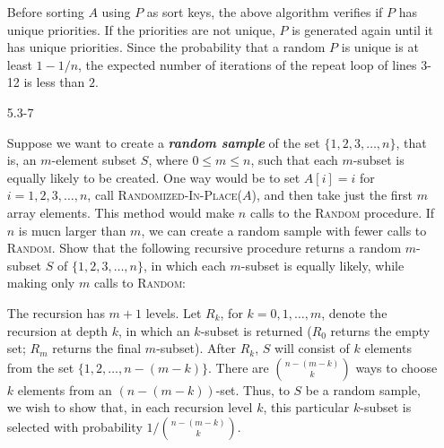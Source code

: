 \begin{enumerate}
\begin{framed}
Before sorting $A$ using $P$ as sort keys, the above algorithm verifies if $P$
has unique priorities. If the priorities are not unique, $P$ is generated again
until it has unique priorities. Since the probability that a random $P$ is
unique is at least $1 - 1/n$, the expected number of iterations of the repeat
loop of lines 3-12 is less than $2$.
\end{framed}

\newpage

\item[5.3{-}7]{Suppose we want to create a \textbf{\emph{random sample}} of the
set $\{1, 2, 3, \dots, n\}$, that is, an $m$-element subset $S$, where
$0 \le m \le n$, such that each $m$-subset is equally likely to be created. One
way would be to set $A[i] = i$ for $i = 1, 2, 3, \dots, n$, call
\textsc{Randomized-In-Place}($A$), and then take just the first $m$ array
elements. This method would make $n$ calls to the \textsc{Random} procedure. If
$n$ is mucn larger than $m$, we can create a random sample with fewer calls to
\textsc{Random}. Show that the following recursive procedure returns a random
$m$-subset $S$ of $\{1, 2, 3, \dots, n\}$, in which each $m$-subset is equally
likely, while making only $m$ calls to \textsc{Random}:

\begin{algorithm}[H]
\SetAlgoNoEnd\DontPrintSemicolon
\BlankLine
{}
\end{algorithm}
}

\begin{framed}
The recursion has $m + 1$ levels. Let $R_k$, for $k = 0, 1, \dots, m$, denote
the recursion at depth $k$, in which an $k$-subset is returned ($R_0$ returns
the empty set; $R_m$ returns the final $m$-subset). After $R_k$, $S$ will
consist of $k$ elements from the set $\{1, 2, \dots, n - (m - k)\}$. There are
$\binom{n - (m - k)}{k}$ ways to choose $k$ elements from an
$(n - (m - k))$-set. Thus, to $S$ be a random sample, we wish to show that, in
each recursion level $k$, this particular $k$-subset is selected with
probability $1/\binom{n - (m - k)}{k}$.


\end{framed}
\end{enumerate}
